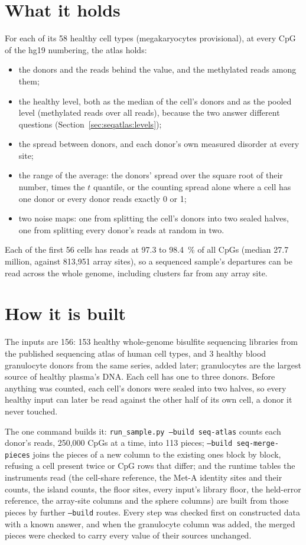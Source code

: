\section{What it holds}

For each of its 58 healthy cell types (megakaryocytes provisional), at every CpG of the hg19 numbering, the atlas holds:
\begin{itemize}
\item the donors and the reads behind the value, and the methylated reads among them;
\item the healthy level, both as the median of the cell's donors and as the pooled level (methylated reads over all reads), because the two answer different questions (Section~\ref{sec:seqatlas:levels});
\item the spread between donors, and each donor's own measured disorder at every site;
\item the range of the average: the donors' spread over the square root of their number, times the $t$ quantile, or the counting spread alone where a cell has one donor or every donor reads exactly 0 or 1;
\item two noise maps: one from splitting the cell's donors into two sealed halves, one from splitting every donor's reads at random in two.
\end{itemize}
Each of the first 56 cells has reads at 97.3 to 98.4~\% of all CpGs (median 27.7 million, against 813,951 array sites), so a sequenced sample's departures can be read across the whole genome, including clusters far from any array site.

\section{How it is built}

The inputs are 156: 153 healthy whole-genome bisulfite sequencing libraries from the published sequencing atlas of human cell types, and 3 healthy blood granulocyte donors from the same series, added later; granulocytes are the largest source of healthy plasma's DNA. Each cell has one to three donors. Before anything was counted, each cell's donors were sealed into two halves, so every healthy input can later be read against the other half of its own cell, a donor it never touched.

The one command builds it: \texttt{run\_sample.py --build seq-atlas} counts each donor's reads, 250,000 CpGs at a time, into 113 pieces; \texttt{--build seq-merge-pieces} joins the pieces of a new column to the existing ones block by block, refusing a cell present twice or CpG rows that differ; and the runtime tables the instruments read (the cell-share reference, the Met-A identity sites and their counts, the island counts, the floor sites, every input's library floor, the held-error reference, the array-site columns and the sphere columns) are built from those pieces by further \texttt{--build} routes. Every step was checked first on constructed data with a known answer, and when the granulocyte column was added, the merged pieces were checked to carry every value of their sources unchanged.

